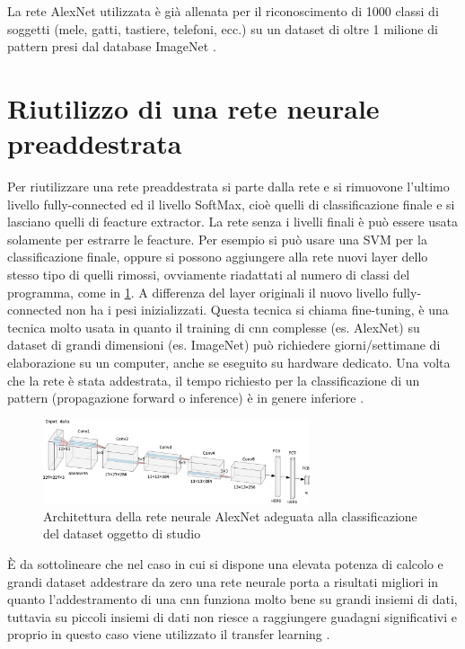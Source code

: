 La rete AlexNet utilizzata è già allenata per il riconoscimento di 1000 classi di soggetti (mele, gatti, tastiere, telefoni, ecc.) su un dataset di oltre 1 milione di pattern presi dal database ImageNet \cite{alexnet}.

\section{Riutilizzo di una rete neurale preaddestrata}\label{riutilizzo-di-una-rete-neurale-preaddestrata}

Per riutilizzare una rete preaddestrata si parte dalla rete e si rimuovone l'ultimo livello \gls{fully-connected} ed il livello \gls{SoftMax}, cioè quelli di classificazione finale e si lasciano quelli di feacture extractor. La rete senza i livelli finali è può essere usata solamente per estrarre le feacture. Per esempio si può usare una SVM per la classificazione finale, oppure si possono  aggiungere alla rete nuovi layer dello stesso tipo di quelli rimossi, ovviamente riadattati al numero di classi del programma, come in \cref{fig:alexnet-tl}. A differenza del layer originali il nuovo  livello \gls{fully-connected} non ha i \gls{pesi} inizializzati. Questa tecnica si chiama fine-tuning, è una tecnica molto usata in quanto il training di \gls{cnn} complesse (es. AlexNet) su dataset di grandi dimensioni (es. ImageNet) può richiedere giorni/settimane di elaborazione su un computer, anche se eseguito su hardware dedicato. Una volta che la rete è stata addestrata, il tempo richiesto per la classificazione di un  pattern (\gls{propagazione forward} o inference) è in genere inferiore \cite{yosinski_tl} \cite{unibo_maltoni_ml}.

\begin{figure}[ht]
    \centering
    \includegraphics[width=0.7\textwidth]{addestramento-rete-neurale/alexnet-tl.pdf}
    \caption{Architettura della rete neurale AlexNet adeguata alla classificazione del dataset oggetto di studio}
    \label{fig:alexnet-tl}
\end{figure}

È da sottolineare che nel caso in cui si dispone una elevata potenza di calcolo e grandi dataset addestrare da zero una rete neurale porta a risultati migliori in quanto l'addestramento di una \gls{cnn} funziona molto bene su grandi insiemi di dati, tuttavia su piccoli insiemi di dati non riesce a raggiungere guadagni significativi e proprio in questo caso viene utilizzato il transfer learning \cite{joel_tl}.

